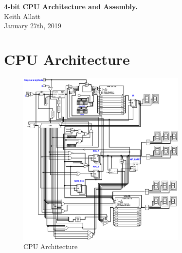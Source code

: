 \documentclass[12pt]{report}
\begin{document}
	
	\begin{center}
		\textbf{4-bit CPU Architecture and Assembly.} \\[8pt]
		\small{Keith Allatt} \\
		\small{January 27th, 2019} \\
	\end{center}
	\newpage
	
	\section{CPU Architecture}
	
		\FloatBarrier
	
	\begin{figure}[!hbt]
		\centering
		\includegraphics[width=0.75\textwidth]{figures/CPU.png}
		\caption{CPU Architecture}
	\end{figure}
\end{document}
